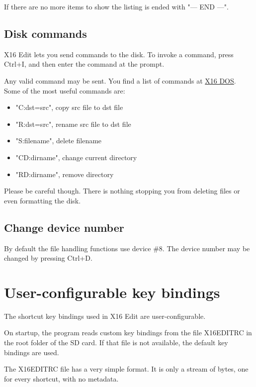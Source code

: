 \documentclass{article}
\begin{document}
    If there are no more items to show the listing is ended with "--- END ---".


    \subsection{Disk commands}

    X16 Edit lets you send commands to the disk. To invoke a command, press Ctrl+I, and then enter
    the command at the prompt.

    Any valid command may be sent. You find a list of commands at 
    \href{https://github.com/commanderx16/x16-rom/tree/master/dos}{X16 DOS}. Some of the most useful commands are:

     \begin{itemize} 
            \item "C:dst=src", copy src file to dst file
            \item "R:dst=src", rename src file to dst file
            \item "S:filename", delete filename
            \item "CD:dirname", change current directory
            \item "RD:dirname", remove directory
    \end{itemize}
    
    Please be careful though. There is nothing stopping you from deleting files or even formatting the
    disk.


    \subsection{Change device number}

    By default the file handling functions use device \#8. The device
    number may be changed by pressing Ctrl+D.

\section{User-configurable key bindings}
\label{keybindings}

The shortcut key bindings used in X16 Edit are user-configurable.

On startup, the program reads custom key bindings from the file X16EDITRC in the
root folder of the SD card. If that file is not available, the default key bindings are
used.

The X16EDITRC file has a very simple format. It is only a stream of bytes, one for every
shortcut, with no metadata.
\end{document}
